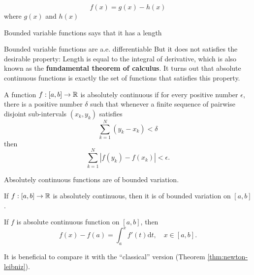 \begin{theorem}
    \begin{equation*}
        f(x)=g(x)-h(x)
    \end{equation*}
    where $g(x)$ and $h(x)$ 
\end{theorem}
Bounded variable functions says that it has a length


Bounded variable functions are a.e. differentiable
But it does not satisfies the desirable property: Length is equal to the integral of derivative,
which is also known as the \textbf{fundamental theorem of calculus}.
It turns out that absolute continuous functions is exactly the set of functions that satisfies this property.


\begin{example}
    
\end{example}



\begin{definition}
    A function $f:[a,b]\to \mathbb{R}$ is absolutely continuous if for every positive number $\epsilon$,  there is a positive number $\delta$ such that 
    whenever a finite sequence of pairwise disjoint sub-intervals $(x_k,y_k)$ satisfies
    $$ \sum_{k=1}^{N}(y_k-x_k)<\delta $$
    then $$\sum_{k=1}^{N}|f(y_k)-f(x_k)|<\epsilon.$$
\end{definition}


Absolutely continuous functions are of bounded variation.
\begin{proposition}
    If $f:[a,b]\to\mathbb{R}$ is absolutely continuous, then it is of bounded variation on $[a,b]$.
\end{proposition}

\begin{theorem}\label{thm:abs-cont}
    If $f$ is absolute continuous function on $[a,b]$, then 
    \begin{equation*}
        f(x)-f(a)=\int_{a}^{x}f'(t)\mathrm{d}t,\quad x\in [a,b].
    \end{equation*}
\end{theorem}

It is beneficial to compare it with the ``classical'' version (Theorem \ref{thm:newton-leibniz}).




